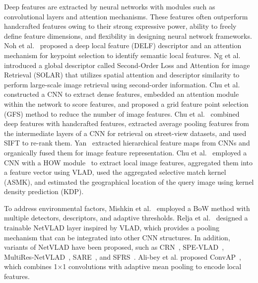 %
Deep features are extracted by neural networks with modules such as convolutional layers and attention mechanisms. These features often outperform handcrafted features owing to their strong expressive power, ability to freely define feature dimensions, and flexibility in designing neural network frameworks. Noh et al.~\cite{noh_large-scale_2017} proposed a deep local feature (DELF) descriptor and an attention mechanism for keypoint selection to identify semantic local features. Ng et al.~\cite{ng_solar_2020} introduced a global descriptor called Second-Order Loss and Attention for image Retrieval (SOLAR) that utilizes spatial attention and descriptor similarity to perform large-scale image retrieval using second-order information. Chu et al.~\cite{chu_grid_2020} constructed a CNN to extract dense features, embedded an attention module within the network to score features, and proposed a grid feature point selection (GFS) method to reduce the number of image features. Chu et al.~\cite{chu_street_2020} combined deep features with handcrafted features, extracted average pooling features from the intermediate layers of a CNN for retrieval on street-view datasets, and used SIFT to re-rank them. Yan~\cite{yan_hierarchical_2021} extracted hierarchical feature maps from CNNs and organically fused them for image feature representation. Chu et al.~\cite{chu_news_2022} employed a CNN with a HOW module~\cite{tolias_learning_2020} to extract local image features, aggregated them into a feature vector using VLAD, used the aggregated selective match kernel (ASMK), and estimated the geographical location of the query image using kernel density prediction (KDP).

%
To address environmental factors, Mishkin et al.~\cite{mishkin_place_2015} employed a BoW method with multiple detectors, descriptors, and adaptive thresholds. Relja et al.~\cite{relja_netvlad_2018} designed a trainable NetVLAD layer inspired by VLAD, which provides a pooling mechanism that can be integrated into other CNN structures. In addition, variants of NetVLAD have been proposed, such as CRN~\cite{kim_learned_2017}, SPE-VLAD~\cite{yu_spatial_2020}, MultiRes-NetVLAD~\cite{khaliq_multires-netvlad_2022}, SARE~\cite{liu_stochastic_2019}, and SFRS~\cite{ge_self-supervising_2020}. Ali-bey et al. proposed ConvAP~\cite{ali-bey_gsv-cities_2022}, which combines 1×1 convolutions with adaptive mean pooling to encode local features.
